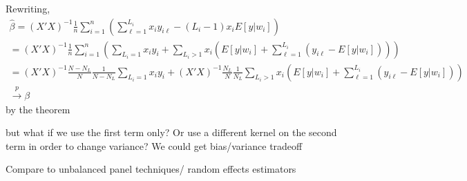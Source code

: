\documentclass[11pt]{amsart}
\newcommand{\toP}{\overset{p}{\to}}
\newcommand{\meanN}{\frac{1}{n}\sum_{i=1}^n}
\newcommand{\sumL}{\sum_{\ell=1}^{L_i}}
\begin{document}
Rewriting,
\begin{gather*} \hat{\beta} = (X'X)^{-1}\meanN \left( \sumL x_i y_{i\ell} - (L_i -1) x_i E[y | w_i]\right) \\
= (X'X)^{-1} \meanN \left( \sum_{L_i = 1} x_i y_i + \sum_{L_i > 1}  x_i \left(E[y | w_i] + \sumL (y_{i\ell} - E[y | w_i] ) \right)\right) \\
= (X'X)^{-1} \frac{N - N_L}{N} \frac{1}{N-N_L} \sum_{L_i = 1} x_i y_i + (X'X)^{-1} \frac{N_L}{N}\frac{1}{N_L} \sum_{L_i> 1} x_i \left(E[y|w_i] + \sum_{\ell=1}^{L_i}(y_{i\ell} - E[y  | w_i])\right)\\ 
\toP \beta
\end{gather*}
by the theorem


but what if we use the first term only?  Or use a different kernel on the second term in order to change variance?  We could get bias/variance tradeoff

Compare to unbalanced panel techniques/ random effects estimators 
\end{document}
